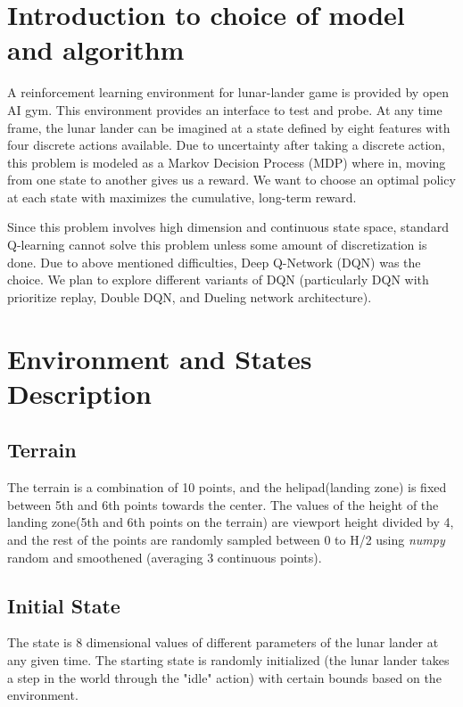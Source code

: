 \section{Introduction to choice of model and algorithm}
\label{intro}
A reinforcement learning environment for lunar-lander game is provided by open AI gym. This environment provides an interface to test and probe. At any time frame, the lunar lander can be imagined at a state defined by eight features with four discrete actions available. Due to uncertainty after taking a discrete action, this problem is modeled as a Markov Decision Process (MDP) where in, moving from one state to another gives us a reward. We want to choose an optimal policy at each state with maximizes the cumulative, long-term reward.

Since this problem involves high dimension and continuous state space, standard Q-learning cannot solve this problem unless some amount of discretization is done. Due to above mentioned difficulties, Deep Q-Network (DQN) was the choice. We  plan to explore different variants of DQN (particularly DQN with prioritize replay, Double DQN, and Dueling network architecture).


\section{Environment and States Description}

\subsection{Terrain} 
The terrain is a combination of 10 points, and the helipad(landing zone) is fixed between 5th and 6th points towards the center. The values of the height of the landing zone(5th and 6th points on the terrain) are viewport height divided by 4, and the rest of the points are randomly sampled between 0 to H/2 using \textit{numpy} random and smoothened (averaging 3 continuous points).

\subsection{Initial State}

The state is 8 dimensional values of different parameters of the lunar lander at any given time. The starting state is randomly initialized (the lunar lander takes a step in the world through the "idle" action) with certain bounds based on the environment.


